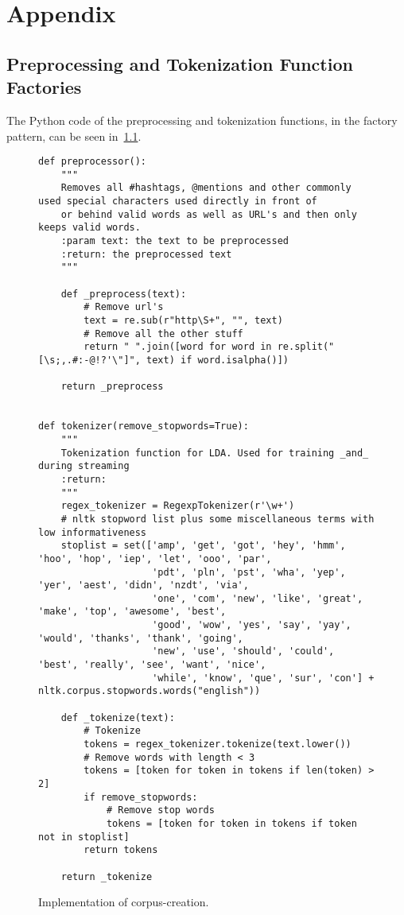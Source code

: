 \chapter{Appendix}
\label{ch:appendix}

\section{Preprocessing and Tokenization Function Factories}
\label{sec:preprocessingAndTokenizationFunctionFactories}
The Python code of the preprocessing and tokenization functions,
in the factory pattern, can be seen in~\ref{code:preprocessing_tokenization}.

\begin{figure}
    \caption{Implementation of corpus-creation.}
    \label{code:preprocessing_tokenization}
    \begin{verbatim}
def preprocessor():
    """
    Removes all #hashtags, @mentions and other commonly used special characters used directly in front of
    or behind valid words as well as URL's and then only keeps valid words.
    :param text: the text to be preprocessed
    :return: the preprocessed text
    """

    def _preprocess(text):
        # Remove url's
        text = re.sub(r"http\S+", "", text)
        # Remove all the other stuff
        return " ".join([word for word in re.split("[\s;,.#:-@!?'\"]", text) if word.isalpha()])

    return _preprocess


def tokenizer(remove_stopwords=True):
    """
    Tokenization function for LDA. Used for training _and_ during streaming
    :return:
    """
    regex_tokenizer = RegexpTokenizer(r'\w+')
    # nltk stopword list plus some miscellaneous terms with low informativeness
    stoplist = set(['amp', 'get', 'got', 'hey', 'hmm', 'hoo', 'hop', 'iep', 'let', 'ooo', 'par',
                    'pdt', 'pln', 'pst', 'wha', 'yep', 'yer', 'aest', 'didn', 'nzdt', 'via',
                    'one', 'com', 'new', 'like', 'great', 'make', 'top', 'awesome', 'best',
                    'good', 'wow', 'yes', 'say', 'yay', 'would', 'thanks', 'thank', 'going',
                    'new', 'use', 'should', 'could', 'best', 'really', 'see', 'want', 'nice',
                    'while', 'know', 'que', 'sur', 'con'] + nltk.corpus.stopwords.words("english"))

    def _tokenize(text):
        # Tokenize
        tokens = regex_tokenizer.tokenize(text.lower())
        # Remove words with length < 3
        tokens = [token for token in tokens if len(token) > 2]
        if remove_stopwords:
            # Remove stop words
            tokens = [token for token in tokens if token not in stoplist]
        return tokens

    return _tokenize
    \end{verbatim}
\end{figure}

\newpage
